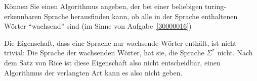 Können Sie einen Algorithmus angeben, der bei einer beliebigen
turing-erkennbaren
Sprache herausfinden kann, ob alle in der Sprache enthaltenen Wörter
``wachsend'' sind (im Sinne von Aufgabe~\ref{30000016})


\begin{loesung}
Die Eigenschaft, dass eine Sprache nur wachsende Wörter
enthält, ist nicht trivial: Die Sprache der wachsenden
Wörter, hat sie, die Sprache $\Sigma^*$ nicht. Nach dem
Satz von Rice ist diese Eigenschaft also nicht entscheidbar,
einen Algorithmus der verlangten Art kann es also nicht geben.
\end{loesung}
